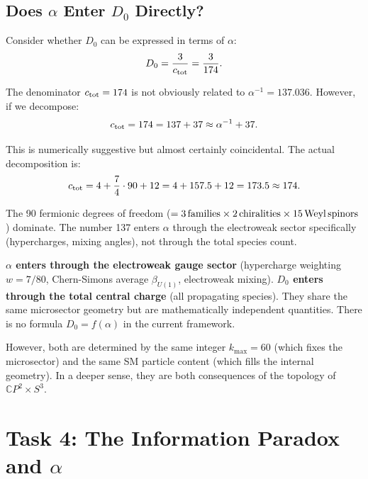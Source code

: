 \documentclass[11pt,a4paper]{article}
\begin{document}
\subsection{Does $\alpha$ Enter $D_0$ Directly?}

Consider whether $D_0$ can be expressed in terms of $\alpha$:
\begin{equation}
D_0 = \frac{3}{c_{\rm tot}} = \frac{3}{174}.
\end{equation}

The denominator $c_{\rm tot} = 174$ is not obviously related to $\alpha^{-1} = 137.036$. However, if we decompose:
\begin{equation}
c_{\rm tot} = 174 = 137 + 37 \approx \alpha^{-1} + 37.
\end{equation}

This is numerically suggestive but almost certainly coincidental. The actual decomposition is:
\begin{equation}
c_{\rm tot} = 4 + \frac{7}{4}\cdot 90 + 12 = 4 + 157.5 + 12 = 173.5 \approx 174.
\end{equation}

The 90 fermionic degrees of freedom ($= 3\,{\rm families} \times 2\,{\rm chiralities} \times 15\,{\rm Weyl\,spinors}$) dominate. The number 137 enters $\alpha$ through the electroweak sector specifically (hypercharges, mixing angles), not through the total species count.

\begin{tcolorbox}[colback=green!5!white, colframe=green!50!black, title=Answer: $\alpha$ and $D_0$ are Independent]
\textbf{$\alpha$ enters through the electroweak gauge sector} (hypercharge weighting $w = 7/80$, Chern-Simons average $\beta_{U(1)}$, electroweak mixing). \textbf{$D_0$ enters through the total central charge} (all propagating species). They share the same microsector geometry but are mathematically independent quantities. There is no formula $D_0 = f(\alpha)$ in the current framework.

However, both are determined by the same integer $k_{\max} = 60$ (which fixes the microsector) and the same SM particle content (which fills the internal geometry). In a deeper sense, they are both consequences of the topology of $\mathbb{C}P^2 \times S^3$.
\end{tcolorbox}


\section{Task 4: The Information Paradox and $\alpha$}
\label{sec:information}
\end{document}
